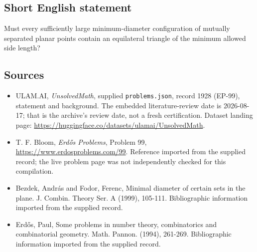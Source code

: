 \documentclass[11pt,a4paper]{article}
\begin{document}
\subsection{Short English statement}

Must every sufficiently large minimum-diameter configuration of mutually separated planar points contain an equilateral triangle of the minimum allowed side length?

\subsection{Sources}

{\small

\begin{itemize}

\item[\hypertarget{source:1928:1}{S1}] ULAM.AI, \emph{UnsolvedMath}, supplied \texttt{problems.json}, record 1928 (EP-99), statement and background. The embedded literature-review date is 2026-08-17; that is the archive’s review date, not a fresh certification. Dataset landing page: \url{https://huggingface.co/datasets/ulamai/UnsolvedMath}.

\item[\hypertarget{source:1928:2}{S2}] T. F. Bloom, \emph{Erdős Problems}, Problem 99, \url{https://www.erdosproblems.com/99}. Reference imported from the supplied record; the live problem page was not independently checked for this compilation.

\item[\hypertarget{source:1928:3}{S3}] Bezdek, Andr\'{a}s and Fodor, Ferenc, Minimal diameter of certain sets in the plane. J. Combin. Theory Ser. A (1999), 105-111. Bibliographic information imported from the supplied record.

\item[\hypertarget{source:1928:4}{S4}] Erd\H{o}s, Paul, Some problems in number theory, combinatorics and combinatorial geometry. Math. Pannon. (1994), 261-269. Bibliographic information imported from the supplied record.

\end{itemize}

}

\label{end:1928}
\end{document}
